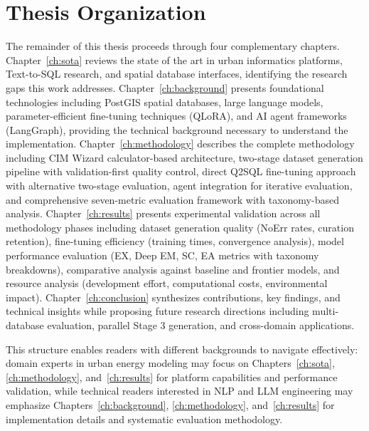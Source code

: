 \section{Thesis Organization}

The remainder of this thesis proceeds through four complementary chapters. Chapter~\ref{ch:sota} reviews the state of the art in urban informatics platforms, Text-to-SQL research, and spatial database interfaces, identifying the research gaps this work addresses. Chapter~\ref{ch:background} presents foundational technologies including PostGIS spatial databases, large language models, parameter-efficient fine-tuning techniques (QLoRA), and AI agent frameworks (LangGraph), providing the technical background necessary to understand the implementation. Chapter~\ref{ch:methodology} describes the complete methodology including CIM Wizard calculator-based architecture, two-stage dataset generation pipeline with validation-first quality control, direct Q2SQL fine-tuning approach with alternative two-stage evaluation, agent integration for iterative evaluation, and comprehensive seven-metric evaluation framework with taxonomy-based analysis. Chapter~\ref{ch:results} presents experimental validation across all methodology phases including dataset generation quality (NoErr rates, curation retention), fine-tuning efficiency (training times, convergence analysis), model performance evaluation (EX, Deep EM, SC, EA metrics with taxonomy breakdowns), comparative analysis against baseline and frontier models, and resource analysis (development effort, computational costs, environmental impact). Chapter~\ref{ch:conclusion} synthesizes contributions, key findings, and technical insights while proposing future research directions including multi-database evaluation, parallel Stage 3 generation, and cross-domain applications.

This structure enables readers with different backgrounds to navigate effectively: domain experts in urban energy modeling may focus on Chapters~\ref{ch:sota}, \ref{ch:methodology}, and~\ref{ch:results} for platform capabilities and performance validation, while technical readers interested in NLP and LLM engineering may emphasize Chapters~\ref{ch:background}, \ref{ch:methodology}, and~\ref{ch:results} for implementation details and systematic evaluation methodology.

